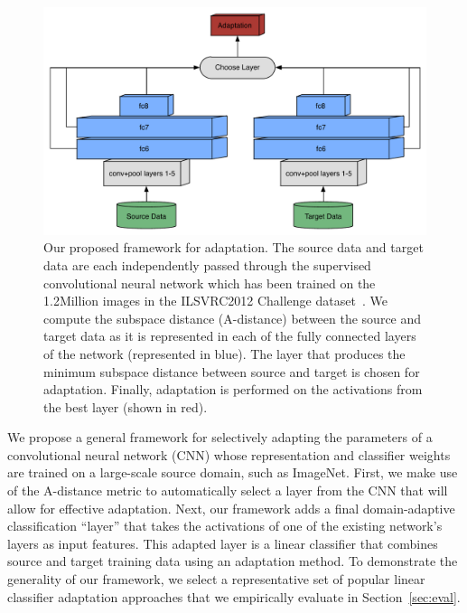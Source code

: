 \newcommand{\svmT}{\bm{\theta}}
\newcommand{\svmB}{b}
\newcommand{\svmAug}{\tilde{\svmT}}
\newcommand{\svmAugAll}{\bm{\Theta}}

\begin{figure}
\begin{center}
\includegraphics[width=.7\linewidth]{figs/model-adapt}
\end{center}
\caption{Our proposed framework for adaptation. The source data and target data are each independently passed through the supervised convolutional neural network which has been trained on the 1.2Million images in the ILSVRC2012 Challenge dataset~\cite{ilsvrc2012}. We compute the subspace distance (A-distance) between the source and target data as it is represented in each of the fully connected layers of the network (represented in blue). The layer that produces the minimum subspace distance between source and target is chosen for adaptation. Finally, adaptation is performed on the activations from the best layer (shown in red).}
\label{fig:model}
\end{figure}


We propose a general framework for selectively adapting the parameters of a
convolutional neural network (CNN) whose representation and classifier weights
are trained on a large-scale source domain, such as ImageNet. First, we make use
of the A-distance metric  to automatically select a layer
from the CNN that will allow for effective adaptation. Next, our framework adds
a final domain-adaptive classification ``layer'' that takes the activations of
one of the existing network's layers as input features. This adapted layer is a
linear classifier that combines source and target training data using an
adaptation method. To demonstrate the generality of our framework, we select a
representative set of popular linear classifier adaptation approaches that we
empirically evaluate in Section~\ref{sec:eval}.

